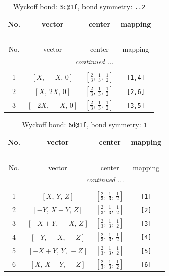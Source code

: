 \documentclass[fleqn,8pt]{jsarticle}
\begin{document}
\begin{longtable}{cccc}
\caption{Wyckoff bond: {\tt 3c@1f}, bond symmetry: {\tt ..2}}
 \\
 \hline \hline
No. & vector & center & mapping \\ \hline \endfirsthead

\multicolumn{3}{l}{\tablename\ \thetable{}} \\
 \hline \hline
No. & vector & center & mapping \\ \hline \endhead

 \hline \hline
\multicolumn{3}{r}{\footnotesize\it continued ...} \\ \endfoot

 \hline \hline
\multicolumn{3}{r}{} \\ \endlastfoot

1 & $\left[ X,\, - X,\, 0 \right]$ & $\left[ \frac{2}{3},\, \frac{1}{3},\, \frac{1}{2} \right]$ & {\tt [1,4]} \\ \hline
2 & $\left[ X,\, 2 X,\, 0 \right]$ & $\left[ \frac{2}{3},\, \frac{1}{3},\, \frac{1}{2} \right]$ & {\tt [2,6]} \\ \hline
3 & $\left[ - 2 X,\, - X,\, 0 \right]$ & $\left[ \frac{2}{3},\, \frac{1}{3},\, \frac{1}{2} \right]$ & {\tt [3,5]} \\
\end{longtable}
\renewcommand{\arraystretch}{1.2}
\begin{longtable}{cccc}
\caption{Wyckoff bond: {\tt 6d@1f}, bond symmetry: {\tt 1}}
 \\
 \hline \hline
No. & vector & center & mapping \\ \hline \endfirsthead

\multicolumn{3}{l}{\tablename\ \thetable{}} \\
 \hline \hline
No. & vector & center & mapping \\ \hline \endhead

 \hline \hline
\multicolumn{3}{r}{\footnotesize\it continued ...} \\ \endfoot

 \hline \hline
\multicolumn{3}{r}{} \\ \endlastfoot

1 & $\left[ X,\, Y,\, Z \right]$ & $\left[ \frac{2}{3},\, \frac{1}{3},\, \frac{1}{2} \right]$ & {\tt [1]} \\ \hline
2 & $\left[ - Y,\, X - Y,\, Z \right]$ & $\left[ \frac{2}{3},\, \frac{1}{3},\, \frac{1}{2} \right]$ & {\tt [2]} \\ \hline
3 & $\left[ - X + Y,\, - X,\, Z \right]$ & $\left[ \frac{2}{3},\, \frac{1}{3},\, \frac{1}{2} \right]$ & {\tt [3]} \\ \hline
4 & $\left[ - Y,\, - X,\, - Z \right]$ & $\left[ \frac{2}{3},\, \frac{1}{3},\, \frac{1}{2} \right]$ & {\tt [4]} \\ \hline
5 & $\left[ - X + Y,\, Y,\, - Z \right]$ & $\left[ \frac{2}{3},\, \frac{1}{3},\, \frac{1}{2} \right]$ & {\tt [5]} \\ \hline
6 & $\left[ X,\, X - Y,\, - Z \right]$ & $\left[ \frac{2}{3},\, \frac{1}{3},\, \frac{1}{2} \right]$ & {\tt [6]} \\
\end{longtable}
\end{document}
